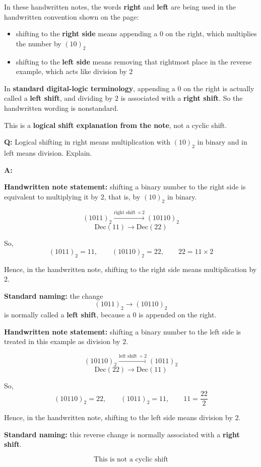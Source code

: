 \documentclass[11pt,a4paper]{book}
\newenvironment{infobox}[1][Information]{%
    \begin{tcolorbox}[
        enhanced,
        breakable,
        colback=mintgreen!10,
        colframe=mintgreen!200,
        title=#1,
        fonttitle=\bfseries,
        sharp corners,
        boxrule=0.8pt,
        left=8pt,
        right=8pt,
        top=6pt,
        bottom=6pt
    ]
}{\end{tcolorbox}}
\newcounter{qna}[chapter]
\renewcommand{\theqna}{\thechapter.\arabic{qna}}
\newenvironment{questionanswerbox}[1][Example]{%
    \refstepcounter{qna}
    \begin{tcolorbox}[
        enhanced,
        breakable,
        colback=softlavender!10,
        colframe=softlavender!200,
        title={#1~\theqna},
        fonttitle=\bfseries,
        coltitle=white,
        colbacktitle=softlavender!200,
        sharp corners,
        boxrule=1pt,
        left=8pt,
        right=8pt,
        top=6pt,
        bottom=6pt
    ]
}{\end{tcolorbox}}
\begin{document}
\begin{infobox}[Shift Reading]
In these handwritten notes, the words \textbf{right} and \textbf{left} are being used in the handwritten convention shown on the page:
\begin{itemize}
    \item shifting to the \textbf{right side} means appending a \(0\) on the right, which multiplies the number by \((10)_2\)
    \item shifting to the \textbf{left side} means removing that rightmost place in the reverse example, which acts like division by \(2\)
\end{itemize}
In \textbf{standard digital-logic terminology}, appending a \(0\) on the right is actually called a \textbf{left shift}, and dividing by \(2\) is associated with a \textbf{right shift}. So the handwritten wording is nonstandard.
\par\vspace{0.5\baselineskip}
This is a \textbf{logical shift explanation from the note}, not a cyclic shift.
\end{infobox}

\begin{questionanswerbox}[Shift Operation Example]
\textbf{Q:} Logical shifting in right means multiplication with \((10)_2\) in binary and in left means division. Explain.

\textbf{A:}

\textbf{Handwritten note statement:} shifting a binary number to the right side is equivalent to multiplying it by \(2\), that is, by \((10)_2\) in binary.

\[
(1011)_2 \xrightarrow{\text{right shift}\ \times 2} (10110)_2
\]
\[
\text{Dec}(11) \longrightarrow \text{Dec}(22)
\]

So,
\[
(1011)_2=11,\qquad (10110)_2=22,\qquad 22=11\times 2
\]

Hence, in the handwritten note, shifting to the right side means multiplication by \(2\).
\par\vspace{0.5\baselineskip}
\textbf{Standard naming:} the change
\[
(1011)_2 \to (10110)_2
\]
is normally called a \textbf{left shift}, because a \(0\) is appended on the right.

\par\vspace{\baselineskip}
\textbf{Handwritten note statement:} shifting a binary number to the left side is treated in this example as division by \(2\).

\[
(10110)_2 \xrightarrow{\text{left shift}\ \div 2} (1011)_2
\]
\[
\text{Dec}(22) \longrightarrow \text{Dec}(11)
\]

So,
\[
(10110)_2=22,\qquad (1011)_2=11,\qquad 11=\frac{22}{2}
\]

Hence, in the handwritten note, shifting to the left side means division by \(2\).
\par\vspace{0.5\baselineskip}
\textbf{Standard naming:} this reverse change is normally associated with a \textbf{right shift}.

\[
\boxed{\text{This is not a cyclic shift}}
\]
\end{questionanswerbox}
\end{document}
